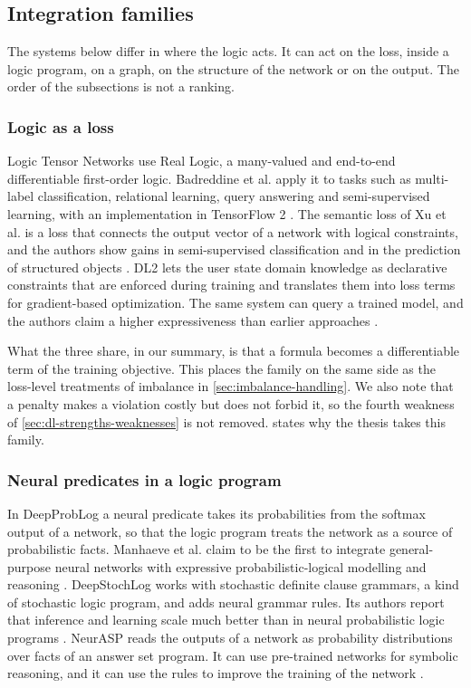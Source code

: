 \subsection{Integration families}
\label{sec:integration-families}

The systems below differ in where the logic acts. It can act on the loss, inside
a logic program, on a graph, on the structure of the network or on the
output. The order of the subsections is not a ranking.

\subsubsection{Logic as a loss}
\label{sec:logic-as-loss}

Logic Tensor Networks use Real Logic, a many-valued and end-to-end
differentiable first-order logic. Badreddine et al. apply it to tasks such as
multi-label classification, relational learning, query answering and
semi-supervised learning, with an implementation in TensorFlow 2
\citep{badreddine2022ltn}. The semantic loss of Xu et al. is a loss that
connects the output vector of a network with logical constraints, and the
authors show gains in semi-supervised classification and in the prediction of
structured objects \citep{xu2018semantic}. DL2 lets the user state domain
knowledge as declarative constraints that are enforced during training and
translates them into loss terms for gradient-based optimization. The same
system can query a trained model, and the authors claim a higher
expressiveness than earlier approaches \citep{fischer2019dl2}.

What the three share, in our summary, is that a formula becomes a
differentiable term of the training objective. This places the family on the
same side as the loss-level treatments of imbalance in
\cref{sec:imbalance-handling}. We also note that a penalty makes a violation
costly but does not forbid it, so the fourth weakness of
\cref{sec:dl-strengths-weaknesses} is not removed. 
states why the thesis takes this family.

\subsubsection{Neural predicates in a logic program}
\label{sec:neural-predicates}

In DeepProbLog a neural predicate takes its probabilities from the softmax
output of a network, so that the logic program treats the network as a source
of probabilistic facts. Manhaeve et al. claim to be the first to integrate
general-purpose neural networks with expressive probabilistic-logical
modelling and reasoning \citep{manhaeve2018deepproblog}. DeepStochLog works
with stochastic definite clause grammars, a kind of stochastic logic program,
and adds neural grammar rules. Its authors report that inference and learning
scale much better than in neural probabilistic logic programs
\citep{winters2022deepstochlog}. NeurASP reads the outputs of a network as
probability distributions over facts of an answer set program. It can use
pre-trained networks for symbolic reasoning, and it can use the rules to
improve the training of the network \citep{yang2020neurasp}.

